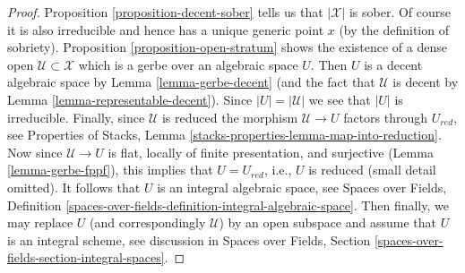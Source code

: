 \documentclass[10pt,a4paper]{amsart}
\theoremstyle{plain}
\theoremstyle{definition}
\theoremstyle{remark}
\numberwithin{equation}{subsection}
\begin{document}
\begin{proof}
Proposition \ref{proposition-decent-sober} tells us that $|\mathcal{X}|$
is sober. Of course it is also irreducible and hence has a unique generic
point $x$ (by the definition of sobriety).
Proposition \ref{proposition-open-stratum} shows
the existence of a dense open $\mathcal{U} \subset \mathcal{X}$
which is a gerbe over an algebraic space $U$.
Then $U$ is a decent algebraic space by
Lemma \ref{lemma-gerbe-decent} (and the fact that $\mathcal{U}$
is decent by Lemma \ref{lemma-representable-decent}).
Since $|U| = |\mathcal{U}|$ we see that $|U|$ is irreducible.
Finally, since $\mathcal{U}$ is reduced the morphism
$\mathcal{U} \to U$ factors through $U_{red}$, see
Properties of Stacks, Lemma \ref{stacks-properties-lemma-map-into-reduction}.
Now since $\mathcal{U} \to U$ is flat, locally of finite presentation,
and surjective (Lemma \ref{lemma-gerbe-fppf}), this implies that
$U = U_{red}$, i.e., $U$ is reduced (small detail omitted).
It follows that $U$ is an integral algebraic space, see
Spaces over Fields, Definition
\ref{spaces-over-fields-definition-integral-algebraic-space}.
Then finally, we may replace $U$ (and correspondingly $\mathcal{U}$)
by an open subspace and assume that $U$ is an integral scheme, see
discussion in  Spaces over Fields, Section
\ref{spaces-over-fields-section-integral-spaces}.
\end{proof}
\end{document}
